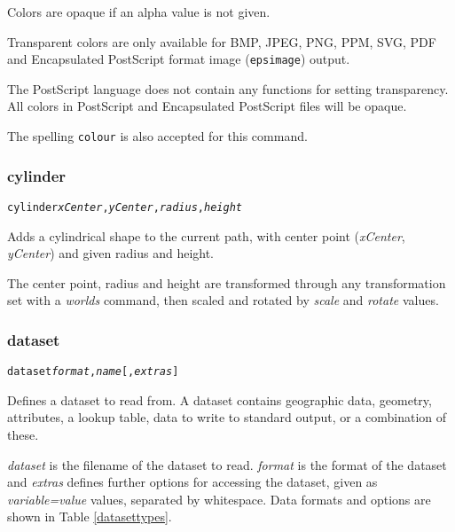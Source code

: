 Colors are opaque if an alpha value is not given.

Transparent colors are only available for BMP, JPEG, PNG, PPM, SVG, PDF
and Encapsulated PostScript format image (\texttt{epsimage}) output.

The PostScript language does not contain any functions for setting
transparency.
All colors in PostScript and Encapsulated PostScript
files will be opaque.

The spelling \texttt{colour} is also accepted for this command.

\subsubsection{cylinder}

\begin{alltt}
cylinder \textit{xCenter}, \textit{yCenter}, \textit{radius}, \textit{height}
\end{alltt}

Adds a cylindrical shape to the current path, with center
point (\textit{xCenter}, \textit{yCenter}) and given radius and height.

The center point, radius and height are transformed through any
transformation set with a \textit{worlds} command,
then scaled and rotated by \textit{scale}
and \textit{rotate} values.

\subsubsection{dataset}

\begin{alltt}
dataset \textit{format}, \textit{name} [, \textit{extras}]
\end{alltt}

Defines a dataset to read from.  A dataset contains geographic data,
geometry, attributes, a lookup table, data to write to standard
output, or a combination of these.

\textit{dataset} is the filename of the dataset to read.
\textit{format} is the format of the dataset and
\textit{extras} defines further options for accessing the dataset, given
as \textit{variable=value} values, separated by whitespace.
Data formats and options are shown in Table \ref{datasettypes}.


